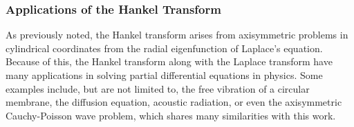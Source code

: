 \documentclass[12pt]{article}
\begin{document}
\subsubsection{Applications of the Hankel Transform}

As previously noted, the Hankel transform arises from axisymmetric problems in cylindrical coordinates from the radial eigenfunction of Laplace's equation. Because of this, the Hankel transform along with the Laplace transform have many applications in solving partial differential equations in physics. Some examples include, but are not limited to, the free vibration of a circular membrane, the diffusion equation, acoustic radiation, or even the axisymmetric Cauchy-Poisson wave problem, which shares many similarities with this work.
\end{document}
